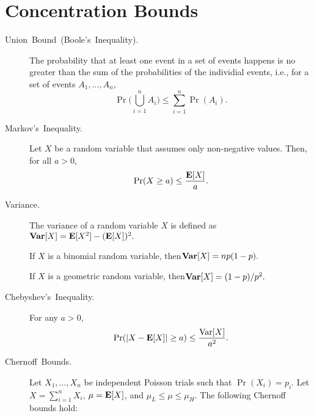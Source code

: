 \documentclass[11pt]{article}
\theoremstyle{mytheoremstyle}
\begin{document}
\section{Concentration Bounds}
\begin{description}
	\item [{Union~Bound~(Boole's~Inequality).}] The probability that at
	least one event in a set of events happens is no greater than the
	sum of the probabilities of the individial events, i.e., for a set
	of events $A_{1},...,A_{n}$,
	\[
	\Pr\Big(\bigcup_{i=1}^{n}A_{i}\Big)\leq\sum_{i=1}^{n}\Pr(A_{i}).
	\]
	\item [{Markov's~Inequality.}] Let $X$ be a random variable that assumes
	only non-negative values. Then, for all $a>0$,
	\[
	\Pr(X\geq a)\leq\frac{\mathrm{\mathbf{E}}[X]}{a}.
	\]
	\item [{Variance.}] The variance of a random variable $X$ is defined as\enspace{}$\mathrm{\mathbf{Var}}[X]=\mathrm{\mathbf{E}}[X^{2}]-(\mathrm{\mathbf{E}}[X])^{2}.$
	
	If $X$ is a binomial random variable, then\enspace{}$\mathrm{\mathbf{Var}}[X]=np(1-p).$
	
	If $X$ is a geometric random variable, then\enspace{}$\mathrm{\mathbf{Var}}[X]=(1-p)/p^{2}.$
	\item [{Chebyshev's~Inequality.}] For any $a>0$,
	\[
	\Pr(|X-\mathrm{\mathbf{E}}[X]|\geq a)\leq\frac{\mathrm{Var}[X]}{a^{2}}.
	\]
	\item [{Chernoff~Bounds.}] Let $X_{1},...,X_{n}$ be independent Poisson
	trials such that $\Pr(X_{i})=p_{i}$. Let $X=\sum_{i=1}^{n}X_{i}$,
	$\mu=\mathrm{\mathbf{E}}[X]$, and $\mu_{L}\leq\mu\leq\mu_{H}$. The following Chernoff
	bounds hold:
	

\end{description}
\end{document}
